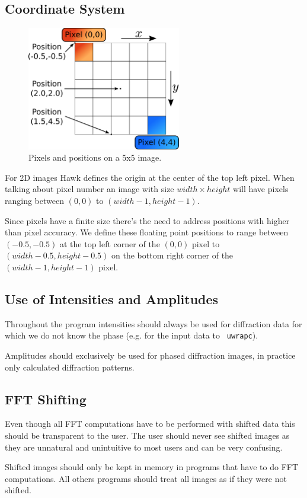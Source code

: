 \documentclass[12pt]{article}
\begin{document}
\subsection{Coordinate System}
\begin{figure}
  \vspace{-40pt}
  \begin{center}
    \includegraphics[width=0.6\textwidth]{coordinate_diagram}
  \end{center}
  \vspace{-20pt}
  \caption{Pixels and positions on a 5x5 image.}
  \vspace{-10pt}
  \label{Fig:Coordinate}
\end{figure}

For 2D images Hawk defines the origin at the center of the top left pixel.
When talking about pixel number an image with size $width \times height$ will have
pixels ranging between $(0,0)$ to $(width-1,height-1)$. 

Since pixels have a finite size there's the need to address positions with
higher than pixel accuracy. We define these floating point positions to range
between $(-0.5,-0.5)$ at the top left corner of the $(0,0)$ pixel to
$(width-0.5,height-0.5)$ on the bottom right corner of the $(width-1,height-1)$
pixel.


\subsection{Use of Intensities and Amplitudes}
Throughout the program intensities should always be used for diffraction data
for which we do not know the phase (e.g. for the input data to {\tt
  uwrapc}). 

Amplitudes should exclusively be used for phased diffraction images,
in practice only calculated diffraction patterns.

\subsection{FFT Shifting}
Even though all FFT computations have to be performed with shifted data this
should be transparent to the user. The user should never see shifted images as
they are unnatural and unintuitive to most users and can be very confusing.

Shifted images should only be kept in memory in programs that have to do FFT
computations. All others programs should treat all images as if they were not shifted.
\end{document}
